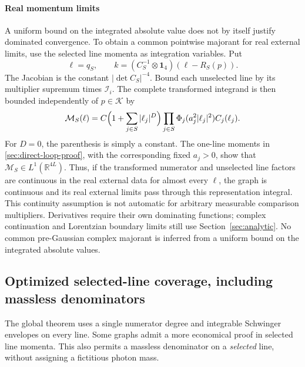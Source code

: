 \documentclass[final,5p,times,twocolumn,numbers,nopreprintline]{elsarticle}
\numberwithin{equation}{section}
\theoremstyle{definition}
\theoremstyle{remark}
\newcommand{\Ph}{\Phi}
\newcommand{\RR}{\mathbb R}
\newcommand{\one}{\mathbf 1}
\begin{document}
\paragraph{Real momentum limits}
A uniform bound on the integrated absolute value does not by itself
justify dominated convergence. To obtain a common pointwise majorant
for real external limits, use the selected line momenta as integration
variables. Put
\[
 \ell=q_S,\qquad
 k=(C_S^{-1}\otimes\one_4)(\ell-R_S(p)).
\]
The Jacobian is the constant \(|\det C_S|^{-4}\). Bound each
unselected line by its multiplier supremum times \(\mathcal I_i\).
The complete transformed integrand is then bounded independently of
\(p\in\mathcal K\) by
\begin{equation}
 \mathcal M_S(\ell)=C\Bigl(1+\sum_{j\in S}|\ell_j|^D\Bigr)
       \prod_{j\in S}\Ph_j(a_j^2|\ell_j|^2)C_j(\ell_j).
 \label{eq:real-parameter-majorant}
\end{equation}
For \(D=0\), the parenthesis is simply a constant. The one-line
moments in \ref{sec:direct-loop-proof}, with the corresponding fixed
\(a_j>0\), show that \(\mathcal M_S\in L^1(\RR^{4L})\).
Thus, if the transformed numerator and unselected line factors are
continuous in the real external data for almost every \(\ell\),
the graph is continuous and its real external limits pass through
this representation integral. This continuity assumption is not
automatic for arbitrary measurable comparison multipliers. Derivatives
require their own dominating functions; complex continuation and
Lorentzian boundary limits still use Section~\ref{sec:analytic}.
No common pre-Gaussian complex majorant is inferred from a uniform
bound on the integrated absolute values.


\subsection{Optimized selected-line coverage, including massless denominators}
\label{sec:optimized-coverage}

The global theorem uses a single numerator degree and integrable
Schwinger envelopes on every line. Some graphs admit a more economical
proof in selected line momenta. This also permits a massless denominator
on a \emph{selected} line, without assigning a fictitious photon mass.
\end{document}
